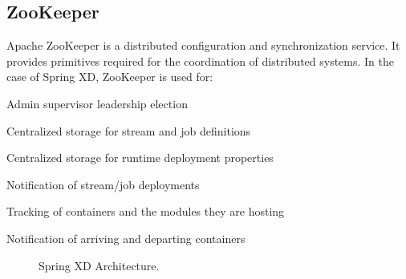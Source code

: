 \subsection{ZooKeeper}
Apache ZooKeeper is a distributed configuration and synchronization service.
It provides primitives required for the coordination of distributed systems.
In the case of Spring XD, ZooKeeper is used for: \begin{itemize*}
	\item Admin supervisor leadership election
	\item Centralized storage for stream and job definitions
	\item Centralized storage for runtime deployment properties
	\item Notification of stream/job deployments
	\item Tracking of containers and the modules they are hosting
	\item Notification of arriving and departing containers
\end{itemize*}
\begin{figure}[ht]
\centering
{}
\caption{Spring XD Architecture.}
\label{fig:architecture}
\end{figure}

